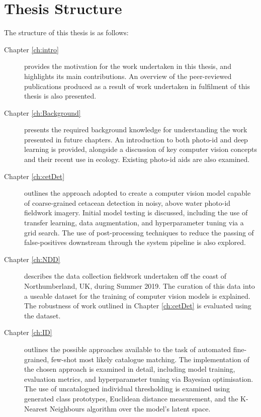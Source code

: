 \section{Thesis Structure}\label{ch:intro,sec:Structure}

The structure of this thesis is as follows:

\begin{description}
	\item[Chapter \ref{ch:intro}] provides the motivation for the work undertaken in this thesis, and highlights its main contributions. An overview of the peer-reviewed publications produced as a result of work undertaken in fulfilment of this thesis is also presented.
	
	\item[Chapter \ref{ch:Background}] presents the required background knowledge for understanding the work presented in future chapters. An introduction to both photo-id and deep learning is provided, alongside a discussion of key computer vision concepts and their recent use in ecology. Existing photo-id aids are also examined.
	
	\newpage
	
	\item[Chapter \ref{ch:cetDet}] outlines the approach adopted to create a computer vision model capable of coarse-grained cetacean detection in noisy, above water photo-id fieldwork imagery. Initial model testing is discussed, including the use of transfer learning, data augmentation, and hyperparameter tuning via a grid search. The use of post-processing techniques to reduce the passing of false-positives downstream through the system pipeline is also explored. 
	
	\item[Chapter \ref{ch:NDD}] describes the data collection fieldwork undertaken off the coast of Northumberland, UK, during Summer 2019. The curation of this data into a useable dataset for the training of computer vision models is explained. The robustness of work outlined in Chapter \ref{ch:cetDet} is evaluated using the dataset. 
	
	\item[Chapter \ref{ch:ID}] outlines the possible approaches available to the task of automated fine-grained, few-shot most likely catalogue matching. The implementation of the chosen approach is examined in detail, including model training, evaluation metrics, and hyperparameter tuning via Bayesian optimisation. The use of uncatalogued individual thresholding is examined using generated class prototypes, Euclidean distance measurement, and the K-Nearest Neighbours algorithm over the model's latent space. 
	

\end{description}
